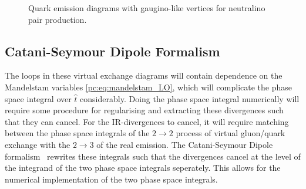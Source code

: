 \documentclass[../main.tex]{subfiles}
\begin{document}
\begin{figure}[ht!]
  \centering
  \begin{subfigure}{0.32\textwidth}
    \centering
    \caption{}
  \end{subfigure}
  \begin{subfigure}{0.32\textwidth}
    \centering
    \caption{}
  \end{subfigure}
  \begin{subfigure}{0.32\textwidth}
    \centering
    \caption{}
  \end{subfigure}
  \begin{subfigure}{0.32\textwidth}
    \centering
    \caption{}
  \end{subfigure}
  \begin{subfigure}{0.32\textwidth}
    \centering
    \caption{}
  \end{subfigure}
  \begin{subfigure}{0.32\textwidth}
    \centering
    \caption{}
  \end{subfigure}
  \caption{Quark emission diagrams with gaugino-like vertices for neutralino pair production.}
  \label{pc:fig:tu_quark_emission}
\end{figure}


\subsection{Catani-Seymour Dipole Formalism}
The loops in these virtual exchange diagrams will contain dependence on the Mandelstam variables \cref{pc:eq:mandelstam_LO}, which will complicate the phase space integral over \(\hat{t}\) considerably.
Doing the phase space integral numerically will require some procedure for regularising and extracting these divergences such that they can cancel.
For the IR-divergences to cancel, it will require matching between the phase space integrals of the \(2 \to 2\) process of virtual gluon/quark exchange with the \(2 \to 3\) of the real emission.
The Catani-Seymour Dipole formalism~\cite{Catani:1996vz} rewrites these integrals such that the divergences cancel at the level of the integrand of the two phase space integrals seperately.
This allows for the numerical implementation of the two phase space integrals.
\end{document}
